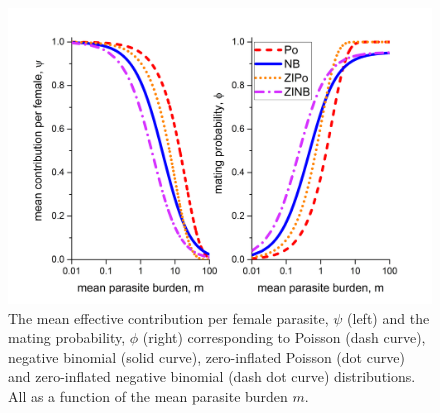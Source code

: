 \documentclass[12pt,a4paper]{article}
\theoremstyle{plain}%
\theoremstyle{definition}
\theoremstyle{remark}
\begin{document}
	\begin{figure}[h!]
		\centering 	\includegraphics[width=0.99\linewidth]{spiandphi}
		\caption{The mean effective contribution per female parasite, $\psi$ (left) and the mating probability, $\phi$ (right) corresponding to Poisson (dash curve), negative binomial (solid curve), zero-inflated Poisson (dot curve) and zero-inflated negative binomial (dash dot curve) distributions. All as a function of the mean parasite burden $m$.}
		\label{fig:phi}
	\end{figure}
	
	
	
	
	
	
	
	
	
	
	
	
\end{document}
